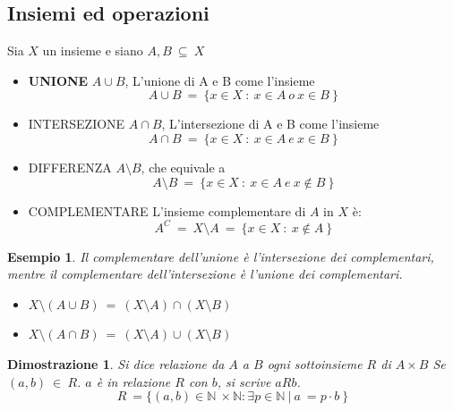 \documentclass[12pt, a4paper]{article}
\theoremstyle{break}
\theoremstyle{lemma}
\theoremstyle{lemma}
\newtheorem{dimo}{Dimostrazione}
\theoremstyle{lemma}
\newtheorem{esem}{Esempio}
\begin{document}
\subsection{Insiemi ed operazioni}
Sia $X$ un insieme e siano $A,B\ \subseteq\ X$
\begin{itemize}
	\item \textbf{UNIONE} $A \cup B$, L'unione di A e B come l'insieme 
		\begin{equation}
			A \cup B\ =\ \{ x \in X\ :\ x\in A\ o\ x\in B\ \}
		\end{equation}
	\item \textsc{INTERSEZIONE} $A \cap B$, L'intersezione di A e B come l'insieme
		\begin{equation}
			A \cap B\ =\ \{ x \in X\ :\ x\in A\ e\ x\in B\ \}
		\end{equation}
	\item \textsc{DIFFERENZA} $A \setminus B$, che equivale a
		\begin{equation}
			A \setminus B\ =\ \{x \in X\ :\ x \in A\ e\ x \notin B\ \}
		\end{equation}
	\item \textsc{COMPLEMENTARE} L'insieme complementare di $A$ in $X$ è:
		\begin{equation}
			A^C\ =\ X \setminus A\ =\ \{x \in X\ :\ x \notin A\ \}
		\end{equation}
\end{itemize}

\begin{esem}

Il complementare dell'unione è l'intersezione dei complementari, mentre il complementare dell'intersezione è l'unione dei complementari.

	\begin{itemize}
	\item $ X \setminus (A \cup B)\ =\ (X \setminus A) \cap(X \setminus B) $
	\item $ X \setminus (A \cap B)\ =\ (X \setminus A) \cup (X \setminus B) $
        \end{itemize}
\end{esem}

\begin{dimo}
	Si dice relazione da $A$ a $B$ ogni sottoinsieme $R$ di $A\times B$ Se $(a,b)\ \in\ R$.
	$a$ è in relazione $R$ con $b$, si scrive $aRb$. 
	\begin{equation} 
		\textit{R}\ = \{ (a,b) \in \mathbb{N}\ \times \mathbb{N}: \exists p \in \mathbb{N}\ |\ a\ = p \cdot b\ \}
	\end{equation}
\end{dimo}
\end{document}
